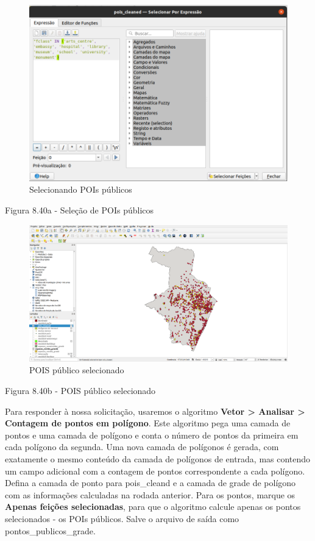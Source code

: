 \documentclass[
]{krantz}
\begin{document}
\begin{figure}
\centering
\includegraphics{media/modulo8/fig840_a.png}
\caption{Selecionando POIs públicos}
\end{figure}

Figura 8.40a - Seleção de POIs públicos

\begin{figure}
\centering
\includegraphics{media/modulo8/fig840_b.png}
\caption{POIS público selecionado}
\end{figure}

Figura 8.40b - POIS público selecionado

Para responder à nossa solicitação, usaremos o algoritmo \textbf{Vetor \textgreater{} Analisar \textgreater{} Contagem de pontos em polígono}. Este algoritmo pega uma camada de pontos e uma camada de polígono e conta o número de pontos da primeira em cada polígono da segunda. Uma nova camada de polígonos é gerada, com exatamente o mesmo conteúdo da camada de polígonos de entrada, mas contendo um campo adicional com a contagem de pontos correspondente a cada polígono. Defina a camada de ponto para pois\_cleand e a camada de grade de polígono com as informações calculadas na rodada anterior. Para os pontos, marque os \textbf{Apenas feições selecionadas}, para que o algoritmo calcule apenas os pontos selecionados - os POIs públicos. Salve o arquivo de saída como pontos\_publicos\_grade.
\end{document}
